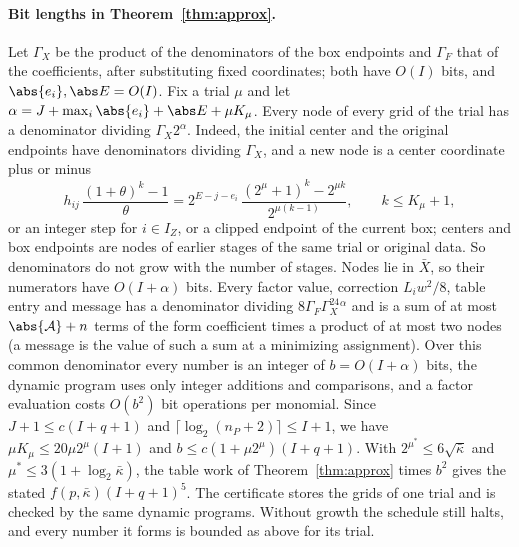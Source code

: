 \paragraph{Bit lengths in Theorem~\ref{thm:approx}.}
Let $\Gamma_X$ be the product of the denominators of the box endpoints and
$\Gamma_F$ that of the coefficients, after substituting fixed coordinates;
both have $O(I)$ bits, and $\abs{e_i},\abs E=O(I)$. Fix a trial $\mu$ and let
$\alpha=J+\max_i\abs{e_i}+\abs E+\mu K_\mu$. Every node of every grid of the
trial has a denominator dividing $\Gamma_X2^\alpha$. Indeed, the initial center
and the original endpoints have denominators dividing $\Gamma_X$, and a new node
is a center coordinate plus or minus
\[
h_{ij}\,\frac{(1+\theta)^k-1}{\theta}
=2^{E-j-e_i}\,\frac{(2^\mu+1)^k-2^{\mu k}}{2^{\mu(k-1)}},\qquad k\le K_\mu+1,
\]
or an integer step for $i\in I_Z$, or a clipped endpoint of the current box;
centers and box endpoints are nodes of earlier stages of the same trial or
original data. So denominators do not grow with the number of stages. Nodes
lie in $\bar X$, so their numerators have $O(I+\alpha)$ bits. Every factor
value, correction $L_iw^2/8$, table entry and message has a denominator dividing
$8\Gamma_F\Gamma_X^24^\alpha$ and is a sum of at most $\abs{\mathcal A}+n$ terms
of the form coefficient times a product of at most two nodes (a message is the
value of such a sum at a minimizing assignment). Over this common denominator
every number is an integer of $b=O(I+\alpha)$ bits, the dynamic program uses
only integer additions and comparisons, and a factor evaluation costs $O(b^2)$
bit operations per monomial. Since $J+1\le c(I+q+1)$ and
$\lceil\log_2(n_P+2)\rceil\le I+1$, we have $\mu K_\mu\le20\mu2^\mu(I+1)$ and
$b\le c(1+\mu2^\mu)(I+q+1)$. With $2^{\mu^*}\le6\sqrt{\bar\kappa}$ and
$\mu^*\le3(1+\log_2\bar\kappa)$, the table work of Theorem~\ref{thm:approx} times
$b^2$ gives the stated $f(p,\bar\kappa)(I+q+1)^5$. The certificate stores the
grids of one trial and is checked by the same dynamic programs. Without growth
the schedule still halts, and every number it forms is bounded as above for
its trial.

